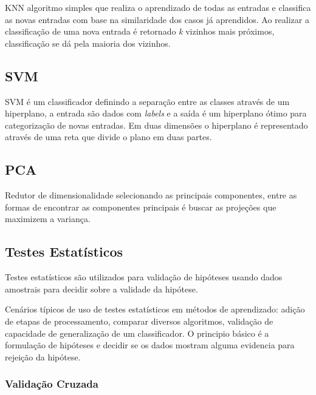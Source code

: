 \documentclass[12pt]{article}
\begin{document}
	KNN algoritmo simples que realiza o aprendizado de todas as entradas e classifica as novas entradas com base na similaridade dos casos já aprendidos. Ao realizar a classificação de uma nova entrada é retornado \emph{k} vizinhos mais próximos, classificação se dá pela maioria dos vizinhos.
	

\subsection{SVM}

	SVM é um classificador definindo a separação entre as classes através de um hiperplano, a entrada são dados com \emph{labels} e a saída é um hiperplano ótimo para categorização de novas entradas. Em duas dimensões o hiperplano é representado através de uma reta que divide o plano em duas partes.
	
\subsection{PCA}

	Redutor de dimensionalidade selecionando as principais componentes, entre as formas de encontrar as componentes principais é buscar as projeções que maximizem a variança.
	
\subsection{Testes Estatísticos}

	Testes estatísticos são utilizados para validação de hipóteses usando dados amostrais para decidir sobre a validade da hipótese.
	
	Cenários típicos de uso de testes estatísticos em métodos de aprendizado: adição de etapas de processamento, comparar diversos algoritmos, validação de capacidade de generalização de um classificador. O principio básico é a formulação de hipóteses e decidir se os dados mostram alguma evidencia para rejeição da hipótese.
	

	\subsubsection{Validação Cruzada}
		
\end{document}
